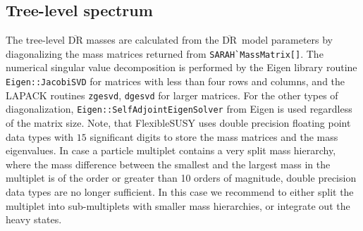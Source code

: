 \documentclass[final,3p,11pt,pdflatex]{elsarticle}
\makeatletter
\newcommand{\fs}{FlexibleSUSY\@\xspace}
\newcommand{\code}[1]{\lstinline|#1|}  %
\newcommand{\textoverline}[1]{$\overline{\mbox{#1}}$}
\newcommand{\DRbar}{\textoverline{DR}\xspace}
\makeatother
\begin{document}
\subsection{Tree-level spectrum}
\label{sec:TreeLevelSpectrum}
The tree-level \DRbar masses are calculated from the \DRbar\ model
parameters by diagonalizing the mass matrices returned from
\code{SARAH`MassMatrix[]}.  The numerical singular value decomposition
is performed by the Eigen library routine \code{Eigen::JacobiSVD} for
matrices with less than four rows and columns, and the LAPACK routines
\code{zgesvd}, \code{dgesvd} for larger matrices.  For the other types
of diagonalization, \code{Eigen::SelfAdjointEigenSolver} from Eigen is
used regardless of the matrix size.  Note, that \fs uses double
precision floating point data types with $15$ significant digits to
store the mass matrices and the mass eigenvalues.  In case a particle
multiplet contains a very split mass hierarchy, where the mass
difference between the smallest and the largest mass in the multiplet
is of the order or greater than 10 orders of magnitude, double
precision data types are no longer sufficient.  In this case we
recommend to either split the multiplet into sub-multiplets with
smaller mass hierarchies, or integrate out the heavy states.
\end{document}
